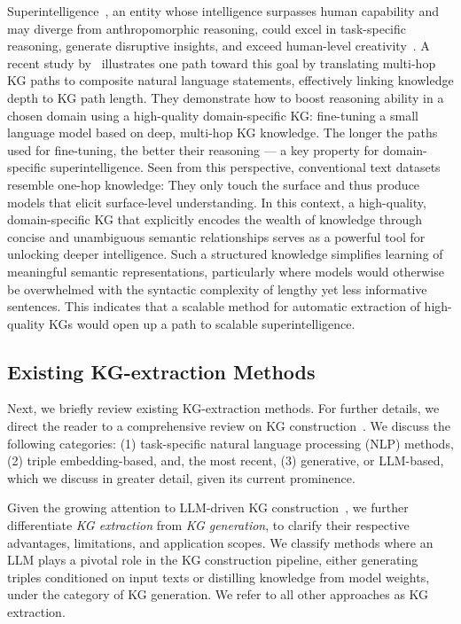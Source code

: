 \documentclass[10pt]{article}
\begin{document}
Superintelligence~\cite{bostrom2014superintelligence}, an entity whose intelligence surpasses human capability and may diverge from anthropomorphic reasoning, could excel in task-specific reasoning, generate disruptive insights, and exceed human-level creativity~\cite{Szocik2020}. A recent study by~\citet{dedhia2025} illustrates one path toward this goal by translating multi-hop KG paths to composite natural language statements, effectively linking knowledge depth to KG path length. They demonstrate how to boost reasoning ability in a chosen domain using a high-quality domain-specific KG: fine-tuning a small language model based on deep, multi-hop KG knowledge. The longer the paths used for fine-tuning, the better their reasoning --- a key property for domain-specific superintelligence. Seen from this perspective, conventional text datasets resemble one-hop knowledge: They only touch the surface and thus produce models that elicit surface-level understanding. In this context, a high-quality, domain-specific KG that explicitly encodes the wealth of knowledge through concise and unambiguous semantic relationships serves as a powerful tool for unlocking deeper intelligence. Such a structured knowledge simplifies learning of meaningful semantic representations, particularly where models would otherwise be overwhelmed with the syntactic complexity of lengthy yet less informative sentences. This indicates that a scalable method for automatic extraction of high-quality KGs would open up a path to scalable superintelligence.

\subsection{Existing KG-extraction Methods}
\label{subsec:existin_kg_extraction_methods}

Next, we briefly review existing KG-extraction methods. For further details, we direct the reader to a comprehensive review on KG construction~\cite{survey_atuomatic_kgc}. We discuss the following categories: (1) task-specific natural language processing (NLP) methods, (2) triple embedding-based, and, the most recent, (3) generative, or LLM-based, which we discuss in greater detail, given its current prominence.

Given the growing attention to LLM-driven KG construction~\cite{LLM_for_kg_construction}, we further differentiate \emph{KG extraction} from \emph{KG generation}, to clarify their respective advantages, limitations, and application scopes. We classify methods where an LLM plays a pivotal role in the KG construction pipeline, either generating triples conditioned on input texts or distilling knowledge from model weights, under the category of KG generation. We refer to all other approaches as KG extraction.
\end{document}
